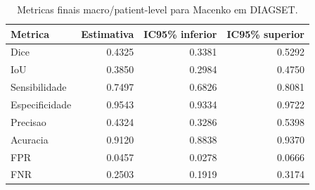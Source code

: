 \begin{table}[!htb]
\centering
\caption{Metricas finais macro/patient-level para Macenko em DIAGSET.}
\label{tab:results_diagset-macro-macenko}
\small
\begin{tabular}{lrrr}
\toprule
Metrica & Estimativa & IC95\% inferior & IC95\% superior \\
\midrule
Dice & 0.4325 & 0.3381 & 0.5292 \\
IoU & 0.3850 & 0.2984 & 0.4750 \\
Sensibilidade & 0.7497 & 0.6826 & 0.8081 \\
Especificidade & 0.9543 & 0.9334 & 0.9722 \\
Precisao & 0.4324 & 0.3286 & 0.5398 \\
Acuracia & 0.9120 & 0.8838 & 0.9370 \\
FPR & 0.0457 & 0.0278 & 0.0666 \\
FNR & 0.2503 & 0.1919 & 0.3174 \\
\bottomrule
\end{tabular}
\end{table}
